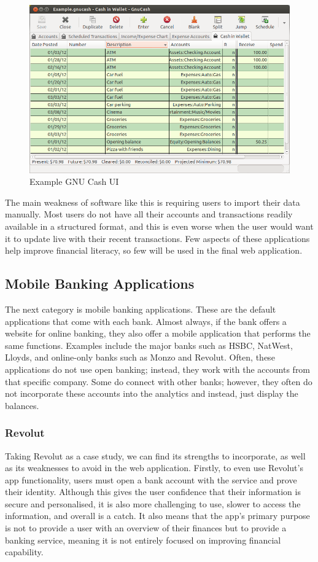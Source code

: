 \begin{figure}[H]
	\centering
    \includegraphics[width=\textwidth]{gnucash.png}
    \caption{Example GNU Cash UI \cite{GNUCashUI}}
    \label{fig:gnucash_ui}
\end{figure}

The main weakness of software like this is requiring users to import their data manually. Most users do not have all their accounts and transactions readily available in a structured format, and this is even worse when the user would want it to update live with their recent transactions. Few aspects of these applications help improve financial literacy, so few will be used in the final web application.


\subsection{Mobile Banking Applications}
\label{sec:mobile-banking-applications}
The next category is mobile banking applications. These are the default applications that come with each bank. Almost always, if the bank offers a website for online banking, they also offer a mobile application that performs the same functions. Examples include the major banks such as HSBC, NatWest, Lloyds, and online-only banks such as Monzo and Revolut. Often, these applications do not use open banking; instead, they work with the accounts from that specific company. Some do connect with other banks; however, they often do not incorporate these accounts into the analytics and instead, just display the balances.

\subsubsection{Revolut}
Taking Revolut \cite{RevolutWebsite} as a case study, we can find its strengths to incorporate, as well as its weaknesses to avoid in the web application. Firstly, to even use Revolut's app functionality, users must open a bank account with the service and prove their identity. Although this gives the user confidence that their information is secure and personalised, it is also more challenging to use, slower to access the information, and overall is a catch. It also means that the app's primary purpose is not to provide a user with an overview of their finances but to provide a banking service, meaning it is not entirely focused on improving financial capability.

